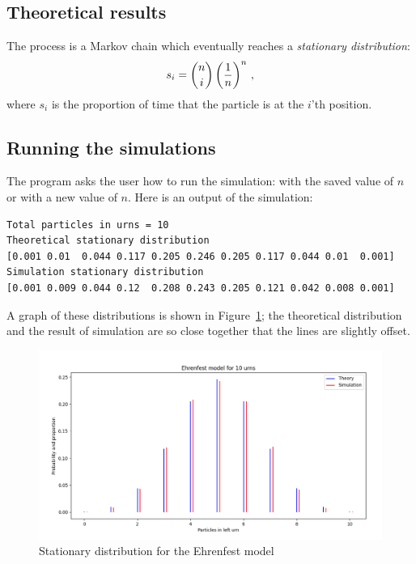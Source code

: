 \subsection{Theoretical results}

The process is a Markov chain which eventually reaches a \emph{stationary distribution}:
\[
s_i=\displaystyle{n \choose i}\left(\frac{1}{n}\right)^n\,,
\]
where $s_i$ is the proportion of time that the particle is at the $i$'th position.

\subsection{Running the simulations}

The program asks the user how to run the simulation: with the saved value of $n$ or with a new value of $n$. Here is an output of the simulation:
\begin{verbatim}
Total particles in urns = 10
Theoretical stationary distribution
[0.001 0.01  0.044 0.117 0.205 0.246 0.205 0.117 0.044 0.01  0.001]
Simulation stationary distribution
[0.001 0.009 0.044 0.12  0.208 0.243 0.205 0.121 0.042 0.008 0.001]
\end{verbatim}
A graph of these distributions is shown in Figure~\ref{f.ehrenfest1}; the theoretical distribution and the result of simulation are so close together that the lines are slightly offset.

\begin{figure}
\begin{center}
\includegraphics[width=\textwidth]{ehrenfest-01}
\caption{Stationary distribution for the Ehrenfest model}\label{f.ehrenfest1}
\end{center}
\end{figure}

